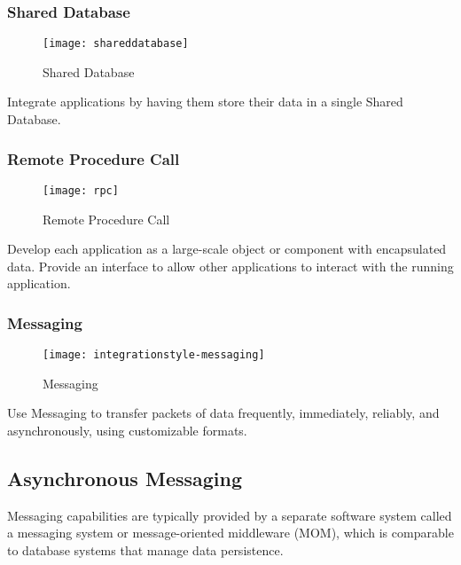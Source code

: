 \subsubsection{Shared Database}
\begin{minipage}{.4\textwidth}
  \begin{figure}[H]
    \center
    \texttt{[image: shareddatabase]}
    \caption{Shared Database}
  \end{figure}
\end{minipage}
\begin{minipage}[b]{.6\textwidth}
  Integrate applications by having them store their data in a single Shared Database.
\end{minipage}

\subsubsection{Remote Procedure Call}
\begin{minipage}{.4\textwidth}
  \begin{figure}[H]
    \center
    \texttt{[image: rpc]}
    \caption{Remote Procedure Call}
  \end{figure}
\end{minipage}
\begin{minipage}[b]{.6\textwidth}
  Develop each application as a large-scale object or component with encapsulated data. Provide an interface to allow other applications to interact with the running application.
\end{minipage}

\subsubsection{Messaging}
\begin{minipage}{.4\textwidth}
  \begin{figure}[H]
    \center
    \texttt{[image: integrationstyle-messaging]}
    \caption{Messaging}
  \end{figure}
\end{minipage}
\begin{minipage}[b]{.6\textwidth}
  Use Messaging to transfer packets of data frequently, immediately, reliably, and asynchronously, using customizable formats.
\end{minipage}

\subsection{Asynchronous Messaging}
Messaging capabilities are typically provided by a separate software system called a messaging system or message-oriented middleware (MOM), which is comparable to database systems that manage data persistence.

